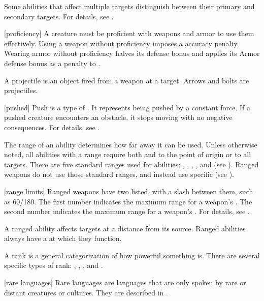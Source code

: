  Some abilities that affect multiple targets distinguish between their primary and secondary targets.
For details, see .

[proficiency] A creature must be proficient with weapons and armor to use them effectively.
Using a weapon without proficiency imposes a  accuracy penalty.
Wearing armor without proficiency halves its defense bonus and applies its Armor defense bonus as a penalty to .

 A projectile is an object fired from a weapon at a target.
Arrows and bolts are projectiles.

[pushed] Push is a type of .
It represents being pushed by a constant force.
If a pushed creature encounters an obstacle, it stops moving with no negative consequences.
For details, see .

 The range of an ability determines how far away it can be used.
Unless otherwise noted, all abilities with a range require both  and  to the point of origin or to all targets.
There are five standard ranges used for abilities: \shortrange, \medrange, \longrange, \distrange, and \extrange (see ).
Ranged weapons do not use those standard ranges, and instead use specific  (see ).

[range limits] Ranged weapons have two  listed, with a slash between them, such as 60/180.
The first number indicates the maximum range for a weapon's .
The second number indicates the maximum range for a weapon's .
For details, see .

 A ranged ability affects targets at a distance from its source.
Ranged abilities always have a  at which they function.

 A rank is a general categorization of how powerful something is.
There are several specific types of rank: , , , and .

[rare languages] Rare languages are languages that are only spoken by rare or distant creatures or cultures.
They are described in .

